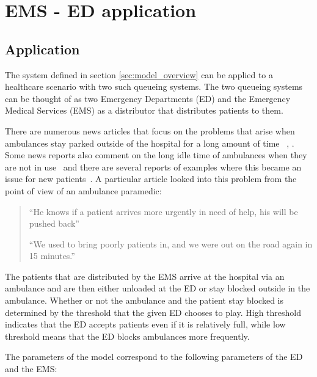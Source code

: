\section{EMS - ED application}\label{sec:ems_ed_application}

\subsection{Application}\label{sec:application}

The system defined in section \ref{sec:model_overview} can be applied 
to a healthcare scenario with two such queueing systems.
The two queueing systems can be thought of as two Emergency Departments (ED) 
and the Emergency Medical Services (EMS) as a distributor that distributes 
patients to them.

There are numerous news articles that focus on the problems that arise when 
ambulances stay parked outside of the hospital for a long amount of time
~\cite{dailyrecords}, \cite{staffordshirelive}.
Some news reports also comment on the long idle time of ambulances when 
they are not in use~\cite{herefordtimes} and there are several reports of 
examples where this became an issue for new patients~\cite{southwalesargus}.
A particular article looked into this problem from the point of view of an 
ambulance paramedic:

\begin{quotation}
    ``He knows if a patient arrives more urgently in need of help, his will be 
    pushed back''~\cite{bbcwales}

    ``We used to bring poorly patients in, and we were out on the road again in
    15 minutes.''~\cite{bbcwales}
\end{quotation}

The patients that are distributed by the EMS arrive at the hospital via an 
ambulance and are then either unloaded at the ED or stay blocked outside in 
the ambulance.
Whether or not the ambulance and the patient stay blocked is determined by 
the threshold that the given ED chooses to play.
High threshold indicates that the ED accepts patients even if it is relatively 
full, while low threshold means that the ED blocks ambulances more frequently.

The parameters of the model correspond to the following parameters of the ED 
and the EMS:

